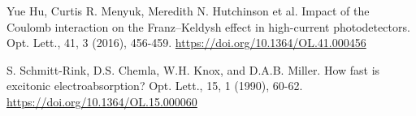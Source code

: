 \documentclass[a4paper,14pt]{extarticle}
\begin{document}
\begin{thebibliography}{99}
     Yue Hu, Curtis R. Menyuk, Meredith N. Hutchinson et al. Impact of the Coulomb interaction on the Franz–Keldysh effect in high-current photodetectors. Opt. Lett., 41, 3 (2016), 456-459. \url{https://doi.org/10.1364/OL.41.000456}
    
     S. Schmitt-Rink, D.S. Chemla, W.H. Knox, and D.A.B. Miller. How fast is excitonic electroabsorption? Opt. Lett., 15, 1 (1990), 60-62. \url{https://doi.org/10.1364/OL.15.000060}

\end{thebibliography}
\end{document}
